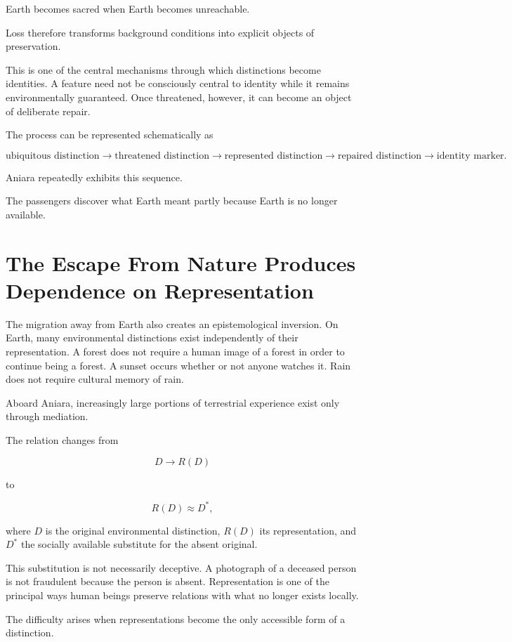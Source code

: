 \documentclass[11pt,oneside]{book}
\theoremstyle{definition}
\theoremstyle{remark}
\begin{document}
Earth becomes sacred when Earth becomes unreachable.

Loss therefore transforms background conditions into explicit objects of preservation.

This is one of the central mechanisms through which distinctions become identities. A feature need not be consciously central to identity while it remains environmentally guaranteed. Once threatened, however, it can become an object of deliberate repair.

The process can be represented schematically as

\[
\text{ubiquitous distinction}
\rightarrow
\text{threatened distinction}
\rightarrow
\text{represented distinction}
\rightarrow
\text{repaired distinction}
\rightarrow
\text{identity marker}.
\]

Aniara repeatedly exhibits this sequence.

The passengers discover what Earth meant partly because Earth is no longer available.

\section{The Escape From Nature Produces Dependence on Representation}

The migration away from Earth also creates an epistemological inversion. On Earth, many environmental distinctions exist independently of their representation. A forest does not require a human image of a forest in order to continue being a forest. A sunset occurs whether or not anyone watches it. Rain does not require cultural memory of rain.

Aboard Aniara, increasingly large portions of terrestrial experience exist only through mediation.

The relation changes from

\[
D\rightarrow R(D)
\]

to

\[
R(D)\approx D^\ast,
\]

where \(D\) is the original environmental distinction, \(R(D)\) its representation, and \(D^\ast\) the socially available substitute for the absent original.

This substitution is not necessarily deceptive. A photograph of a deceased person is not fraudulent because the person is absent. Representation is one of the principal ways human beings preserve relations with what no longer exists locally.

The difficulty arises when representations become the only accessible form of a distinction.
\end{document}
